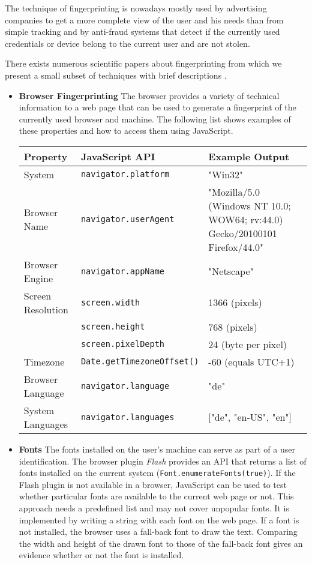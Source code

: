 	The technique of fingerprinting is nowadays mostly used by advertising companies to get a more complete view of the user and his needs than from simple tracking and by anti-fraud systems that detect if the currently used credentials or device belong to the current user and are not stolen.

	There exists numerous scientific papers about fingerprinting from which we present a small subset of techniques with brief descriptions \cite{paulstone_historysniffing, MBYS11, Nikiforakis:2013:CME:2497621.2498133, Eckersley:2010:UYW:1881151.1881152, MS12, olejnik:hal-00747841}. 
	
	\begin{itemize}
		\item \textbf{Browser Fingerprinting} The browser provides a variety of technical information to a web page that can be used to generate a fingerprint of the currently used browser and machine. The following list shows examples of these properties and how to access them using JavaScript. 
		
		\begin{tabular}{|l|l|p{}|} \hline
			\textbf{Property} & \textbf{JavaScript API} & \textbf{Example Output} \\ \hline
			System & \texttt{navigator.platform} & "Win32" \\ \hline
			Browser Name & \texttt{navigator.userAgent} & "Mozilla/5.0 (Windows NT 10.0; WOW64; rv:44.0) Gecko/20100101 Firefox/44.0" \\ \hline
			Browser Engine & \texttt{navigator.appName} & "Netscape" \\ \hline
			Screen Resolution & \texttt{screen.width} & 1366 (pixels) \\
			& \texttt{screen.height} & 768 (pixels) \\
			& \texttt{screen.pixelDepth} & 24 (byte per pixel) \\ \hline
			Timezone & \texttt{Date.getTimezoneOffset()} & -60 (equals UTC+1) \\ \hline
			Browser Language & \texttt{navigator.language} & "de" \\ \hline
			System Languages & \texttt{navigator.languages} & ["de", "en-US", "en"] \\ \hline
		\end{tabular}
		
		\item \textbf{Fonts} The fonts installed on the user's machine can serve as part of a user identification. The browser plugin \textit{Flash} provides an API that returns a list of fonts installed on the current system (\texttt{Font.enumerateFonts(true)})\cite{flashPlayerGetFonts}. If the Flash plugin is not available in a browser, JavaScript can be used to test whether particular fonts are available to the current web page or not. This approach needs a predefined list and may not cover unpopular fonts. It is implemented by writing a string with each font on the web page. If a font is not installed, the browser uses a fall-back font to draw the text. Comparing the width and height of the drawn font to those of the fall-back font gives an evidence whether or not the font is installed.
		

\end{itemize}
